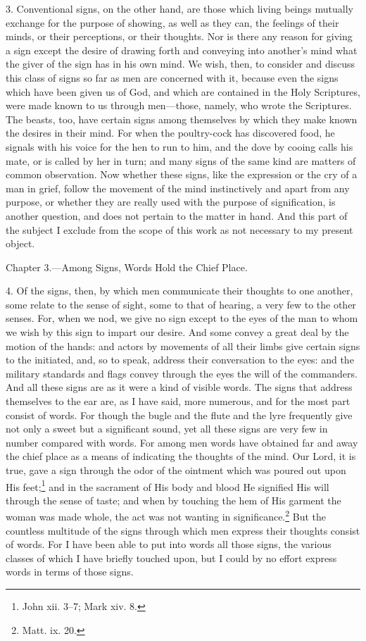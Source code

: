 3. Conventional signs, on the other hand, are those which living beings mutually exchange for the purpose of showing, as well as they can, the feelings of their minds, or their perceptions, or their thoughts. Nor is there any reason for giving a sign except the desire of drawing forth and conveying into another’s mind what the giver of the sign has in his own mind. We wish, then, to consider and discuss this class of signs so far as men are concerned with it, because even the signs which have been given us of God, and which are contained in the Holy Scriptures, were made known to us through men—those, namely, who wrote the Scriptures. The beasts, too, have certain signs among themselves by which they make known the desires in their mind. For when the poultry-cock has discovered food, he signals with his voice for the hen to run to him, and the dove by cooing calls his mate, or is called by her in turn; and many signs of the same kind are matters of common observation. Now whether these signs, like the expression or the cry of a man in grief, follow the movement of the mind instinctively and apart from any purpose, or whether they are really used with the purpose of signification, is another question, and does not pertain to the matter in hand. And this part of the subject I exclude from the scope of this work as not necessary to my present object.


Chapter 3.—Among Signs, Words Hold the Chief Place.

4. Of the signs, then, by which men communicate their thoughts to one another, some relate to the sense of sight, some to that of hearing, a very few to the other senses. For, when we nod, we give no sign except to the eyes of the man to whom we wish by this sign to impart our desire. And some convey a great deal by the motion of the hands: and actors by movements of all their limbs give certain signs to the initiated, and, so to speak, address their conversation to the eyes: and the military standards and flags convey through the eyes the will of the commanders. And all these signs are as it were a kind of visible words. The signs that address themselves to the ear are, as I have said, more numerous, and for the most part consist of words. For though the bugle and the flute and the lyre frequently give not only a sweet but a significant sound, yet all these signs are very few in number compared with words. For among men words have obtained far and away the chief place as a means of indicating the thoughts of the mind. Our Lord, it is true, gave a sign through the odor of the ointment which was poured out upon His feet;\footnote{John xii. 3–7; Mark xiv. 8.} and in the sacrament of His body and blood He signified His will through the sense of taste; and when by touching the hem of His garment the woman was made whole, the act was not wanting in significance.\footnote{Matt. ix. 20.} But the countless multitude of the signs through which men express their thoughts consist of words. For I have been able to put into words all those signs, the various classes of which I have briefly touched upon, but I could by no effort express words in terms of those signs.

